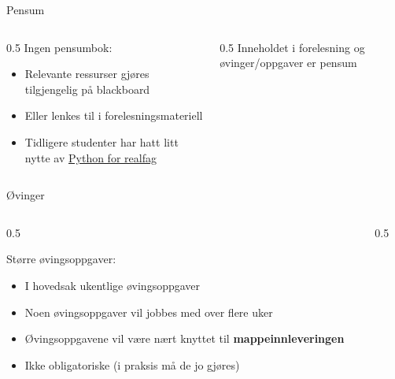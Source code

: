 \documentclass[aspectratio=169]{beamer}
\begin{document}
\begin{frame}{Pensum}
  \begin{columns}
    \begin{column}{0.5\textwidth}
      Ingen pensumbok:
        \begin{itemize}
          \item {Relevante ressurser gjøres tilgjengelig på blackboard}
          \item {Eller lenkes til i forelesningsmateriell}
          \item {Tidligere studenter har hatt litt nytte av \href{https://www.akademika.no/teknologi/data-og-informasjonsteknologi/python-realfag/9788245046052?gad_source=1&gclid=EAIaIQobChMIh5HM4fqFiAMVH1iRBR18gQPXEAAYAiAAEgI-E_D_BwE}{Python for realfag}}
        \end{itemize}
    \end{column}

    \begin{column}{0.5\textwidth}
      Inneholdet i forelesning og øvinger/oppgaver er pensum
    \end{column}
  \end{columns}
\end{frame}

\begin{frame}{Øvinger}
  \begin{columns}
    \begin{column}{0.5\textwidth}
      \begin{block}{Større øvingsoppgaver:}
        \begin{itemize}
          \item {I hovedsak ukentlige øvingsoppgaver}
          \item {Noen øvingsoppgaver vil jobbes med over flere uker}
          \item {Øvingsoppgavene vil være nært knyttet til \textbf{mappeinnleveringen}}
          \item {Ikke obligatoriske (i praksis må de jo gjøres)}
        \end{itemize}
      \end{block}
    \end{column}
    \begin{column}{0.5\textwidth}
    \end{column}
  \end{columns}
\end{frame}
\end{document}
